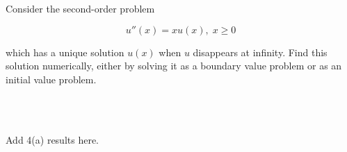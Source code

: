 Consider the second-order problem

$$
u''(x) = x u(x),\; x \ge 0
$$

which has a unique solution $u(x)$ when $u$ disappears at infinity. Find this solution numerically, either by solving
it as a boundary value problem or as an initial value problem.

\begin{solution}\ \\\\
    \newpage
    \hfill\vfill
    \pagebreak

    Add 4(a) results here.
    \ \\
\end{solution}